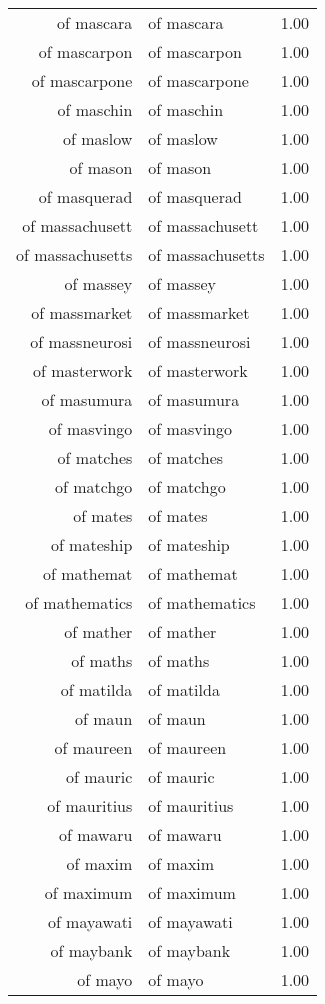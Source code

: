 \begin{table}[ht]
\begin{tabular}{rlr}
  of mascara & of mascara & 1.00 \\ 
  of mascarpon & of mascarpon & 1.00 \\ 
  of mascarpone & of mascarpone & 1.00 \\ 
  of maschin & of maschin & 1.00 \\ 
  of maslow & of maslow & 1.00 \\ 
  of mason & of mason & 1.00 \\ 
  of masquerad & of masquerad & 1.00 \\ 
  of massachusett & of massachusett & 1.00 \\ 
  of massachusetts & of massachusetts & 1.00 \\ 
  of massey & of massey & 1.00 \\ 
  of massmarket & of massmarket & 1.00 \\ 
  of massneurosi & of massneurosi & 1.00 \\ 
  of masterwork & of masterwork & 1.00 \\ 
  of masumura & of masumura & 1.00 \\ 
  of masvingo & of masvingo & 1.00 \\ 
  of matches & of matches & 1.00 \\ 
  of matchgo & of matchgo & 1.00 \\ 
  of mates & of mates & 1.00 \\ 
  of mateship & of mateship & 1.00 \\ 
  of mathemat & of mathemat & 1.00 \\ 
  of mathematics & of mathematics & 1.00 \\ 
  of mather & of mather & 1.00 \\ 
  of maths & of maths & 1.00 \\ 
  of matilda & of matilda & 1.00 \\ 
  of maun & of maun & 1.00 \\ 
  of maureen & of maureen & 1.00 \\ 
  of mauric & of mauric & 1.00 \\ 
  of mauritius & of mauritius & 1.00 \\ 
  of mawaru & of mawaru & 1.00 \\ 
  of maxim & of maxim & 1.00 \\ 
  of maximum & of maximum & 1.00 \\ 
  of mayawati & of mayawati & 1.00 \\ 
  of maybank & of maybank & 1.00 \\ 
  of mayo & of mayo & 1.00 \\ 

\end{tabular}
\end{table}
